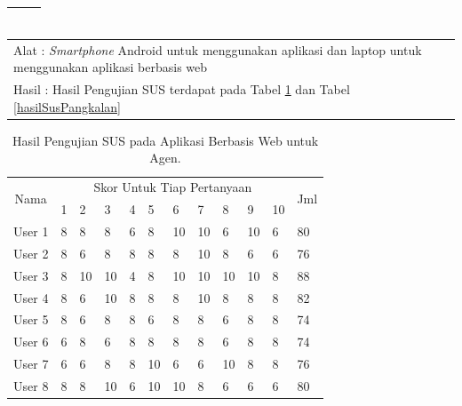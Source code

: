 \begin{center}
\begin{table}[H]
\begin{tabular}{ |p{12cm}|  }
\begin{enumerate}[a.]
\begin{enumerate}[1.]
						\end{enumerate}
				\end{enumerate}
				 \\
				\hline
			\end{tabular}
		\end{table}
	\end{center}

	\begin{center}
	\begin{tabular}{ |p{12cm}|  }
		\hline
		Alat   : \textit{Smartphone} Android untuk menggunakan aplikasi dan laptop untuk menggunakan aplikasi berbasis web\\
		Hasil : Hasil Pengujian SUS terdapat pada Tabel \ref{hasilSusAgen} dan Tabel \ref{hasilSusPangkalan}\\
		\hline
	\end{tabular}
\end{center}

\begin{table}[H]
	\center
	\caption{Hasil Pengujian SUS pada Aplikasi Berbasis Web untuk Agen.}
	\label{hasilSusAgen}
	\begin{tabular}{|c|l|l|l|l|l|l|l|l|l|l|l|}
		\hline
		\multirow{2}{*}{Nama} & \multicolumn{10}{c|}{Skor Untuk Tiap Pertanyaan} &  \multirow{2}{0.5cm}{Jml} \\ \cline{2-11} 
		&1 &2  &3 &4 &5 &6 &7 &8 &9 &10& \\
		\hline
		User 1 &8 &8 &8 &6 &8 &10 &10 &6 &10 &6 &80 \\ 
		\hline
		User 2 &8 &6 &8 &8 &8 &8 &10 &8 &6 &6 &76 \\ 
		\hline
		User 3 &8 &10 &10 &4 &8 &10 &10 &10 &10 &8 &88 \\ 
		\hline
		User 4 &8 &6 &10 &8 &8 &8 &10 &8 &8 &8 &82 \\ 
		\hline
		User 5 &8 &6 &8 &8 &6 &8 &8 &6 &8 &8 &74 \\ 
		\hline
		User 6 &6 &8 &6 &8 &8 &8 &8 &6 &8 &8 &74 \\ 
		\hline
		User 7 &6 &6 &8 &8 &10 &6 &6 &10 &8 &8 &76 \\ 
		\hline
		User 8 &8 &8 &10 &6 &10 &10 &8 &6 &6 &6 &80 \\ 
		\hline
	\end{tabular}
\end{table}

